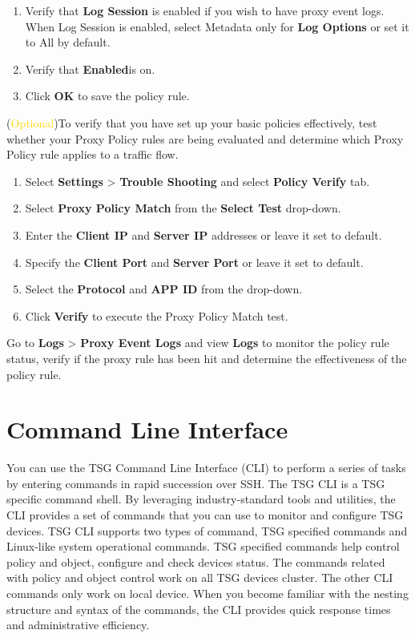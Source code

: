 \begin{description}
\begin{enumerate}
        \item Verify that \textbf{Log Session} is enabled if you wish to have proxy event logs. When Log Session is enabled, select Metadata only for \textbf{Log Options} or set it to All by default. 
        \item Verify that \textbf{Enabled}is on.
        \item Click \textbf{OK} to save the policy rule.
    \end{enumerate}
    \item[STEP 2.] (\textcolor{gold}{Optional})To verify that you have set up your basic policies effectively, test whether your Proxy Policy rules are being evaluated 
    and determine which Proxy Policy rule applies to a traffic flow.
    \begin{enumerate} 
        \item Select \textbf{Settings} > \textbf{Trouble Shooting} and select \textbf{Policy Verify} tab.
        \item Select \textbf{Proxy Policy Match} from the \textbf{Select Test} drop-down. 
        \item Enter the \textbf{Client IP} and \textbf{Server IP} addresses or leave it set to default.
        \item Specify the \textbf{Client Port} and \textbf{Server Port} or leave it set to default.
        \item Select the \textbf{Protocol} and \textbf{APP ID} from the drop-down. 
        \item Click \textbf{Verify} to execute the Proxy Policy Match test.
    \end{enumerate}
    \item[STEP 3.] Go to \textbf{Logs} > \textbf{Proxy Event Logs} and view \textbf{Logs} to monitor the policy rule status, verify if the proxy rule has been hit and determine the effectiveness of the policy rule.
\end{description}

\section*{\hypertarget{link:Command Line Interface}{Command Line Interface}}
\label{sec:intro:command}

You can use the TSG Command Line Interface (CLI) to perform a series of tasks by entering commands in rapid succession over SSH. 
The TSG CLI is a TSG specific command shell. By leveraging industry-standard tools and utilities, the CLI provides a set of commands that you can use to monitor and configure TSG devices. 
TSG CLI supports two types of command, TSG specified commands and Linux-like system operational commands. 
TSG specified commands help control policy and object, configure and check devices status. The commands related with policy and object control work on all TSG devices cluster. 
The other CLI commands only work on local device. When you become familiar with the nesting structure and syntax of the commands, the CLI provides quick response times and administrative efficiency.


